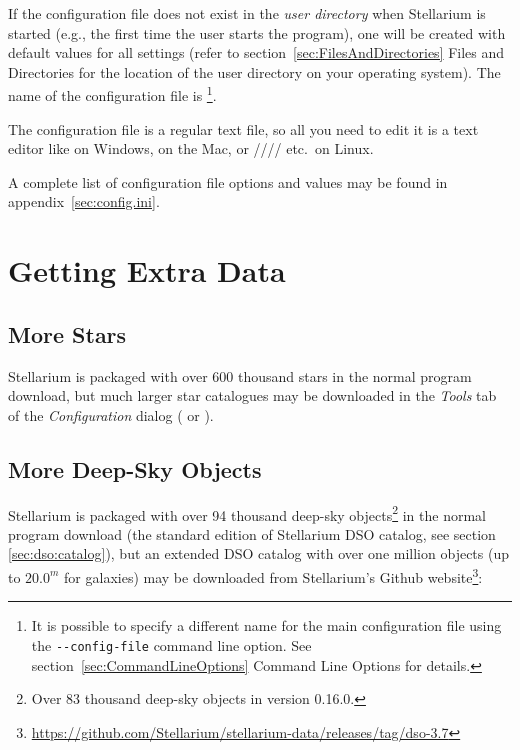 If the configuration file does not exist in the \emph{user directory}
when Stellarium is started (e.g., the first time the user starts the
program), one will be created with default values for all settings
(refer to section~\ref{sec:FilesAndDirectories} Files and
Directories for the location of the user directory on your operating
system). The name of the configuration file is
\footnote{It is possible to specify a different name
  for the main configuration file using the \texttt{-\/-config-file}
  command line option. See section~\ref{sec:CommandLineOptions} Command 
  Line Options for details.}.

The configuration file is a regular text file, so all you need to edit
it is a text editor like  on Windows,  on
the Mac, or //// etc.\ on Linux.

A complete list of configuration file options and values may be found
in appendix~\ref{sec:config.ini}.


\section{Getting Extra Data}
\label{sec:ExtraData}

\subsection{More Stars}
\label{sec:ExtraData:stars}
Stellarium is packaged with over 600 thousand stars in the normal
program download, but much larger star catalogues may be downloaded
in the \emph{Tools} tab of the \emph{Configuration} dialog ( or
).

\subsection{More Deep-Sky Objects}
\label{sec:ExtraData:DSOs}

\noindent{}Stellarium is packaged with over 94 thousand deep-sky 
objects\footnote{Over 83 thousand deep-sky objects in version 0.16.0.} in the normal
program download (the standard edition of Stellarium DSO catalog, see section \ref{sec:dso:catalog}), 
but an extended DSO catalog with over one million objects (up to $20.0^m$ for galaxies) may be downloaded
from Stellarium's Github website\footnote{\url{https://github.com/Stellarium/stellarium-data/releases/tag/dso-3.7}}:

